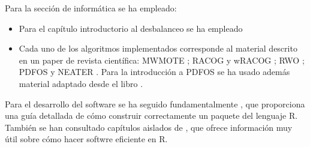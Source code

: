    Para la sección de informática se ha empleado:
   
  \begin{itemize}
   \item Para el capítulo introductorio al desbalanceo se ha empleado \citep{he2009} 
   \item Cada uno de los algoritmos implementados corresponde al material descrito en un paper de revista científica: 
   MWMOTE \citep{barua14}; RACOG y wRACOG \citep{das2015}; RWO \citep{zhang2014}; PDFOS \citep{gao2014} y 
   NEATER \citep{almogahed2014}. Para la introducción a PDFOS se ha usado además material adaptado desde el libro \citep{silverman}.
  \end{itemize}

   Para el desarrollo del software se ha seguido fundamentalmente \citep{rhadleypkg}, que proporciona una guía detallada de
   cómo construir correctamente un paquete del lenguaje R. También se han consultado capítulos aislados de \citep{rgillespie},
   que ofrece información muy útil sobre cómo hacer softwre eficiente en R.